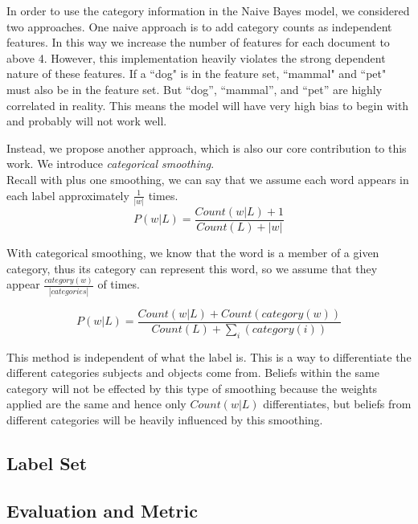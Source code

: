 In order to use the category information in the Naive Bayes model, we considered two approaches. One naive approach is to add category counts as independent features. In this way we increase the number of features for each document to above 4. However, this implementation heavily violates the strong dependent nature of these features. If a ``dog" is in the feature set, ``mammal" and ``pet" must also be in the feature set. But ``dog'', ``mammal'', and ``pet'' are highly correlated in reality. This means the model will have very high bias to begin with and probably will not work well.

Instead, we propose another approach, which is also our core contribution to this work. We introduce \emph{categorical smoothing}.\\

Recall with plus one smoothing, we can say that we assume each word appears in each label approximately $\frac{1}{|w|}$ times.\\

\begin{equation}
	P(w|L) = \frac{Count(w|L)+1}{Count(L)+|w|}
\end{equation}

With categorical smoothing, we know that the word is a member of a given category, thus its category can represent this word, so we assume that they appear $\frac{category(w)}{|categories|}$ of times. 

\begin{equation}
	P(w|L) = \frac{Count(w|L)+Count(category(w))}{Count(L)+\sum_i(category(i))}
\end{equation}

This method is independent of what the label is. This is a way to differentiate the different categories subjects and objects come from. Beliefs within the same category will not be effected by this type of smoothing because the weights applied are the same and hence only $Count(w|L)$ differentiates, but beliefs from different categories will be heavily influenced by this smoothing.

\subsection{Label Set}


\subsection{Evaluation and Metric}

